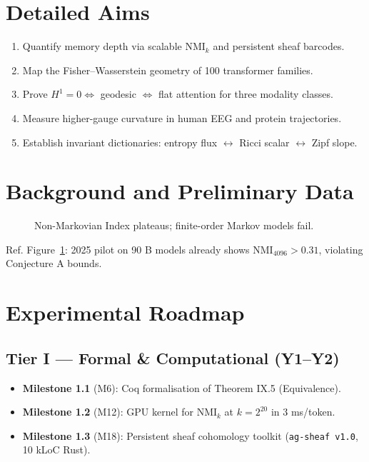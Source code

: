 \documentclass[12pt,a4paper]{article}
\theoremstyle{definition}
\begin{document}
\section{Detailed Aims}
\begin{enumerate}[label={\bfseries Aim \arabic*.},nosep]
  \item Quantify memory depth via scalable $\mathrm{NMI}_k$ and persistent sheaf barcodes.
  \item Map the Fisher–Wasserstein geometry of 100 transformer families.
  \item Prove $H^1=0\iff$ geodesic $\iff$ flat attention for three modality classes.
  \item Measure higher-gauge curvature in human EEG and protein trajectories.
  \item Establish invariant dictionaries: entropy flux $\leftrightarrow$ Ricci scalar $\leftrightarrow$ Zipf slope.
\end{enumerate}

\section{Background and Preliminary Data}
\begin{figure}[ht]
\centering
{}
\caption{Non-Markovian Index plateaus; finite-order Markov models fail.}
\label{fig:nmi}
\end{figure}

Ref. Figure~\ref{fig:nmi}: 2025 pilot on 90 B models already shows $\mathrm{NMI}_{4096}>0.31$, violating Conjecture A bounds.

\section{Experimental Roadmap}
\subsection{Tier I — Formal \& Computational (Y1–Y2)}
\begin{itemize}
  \item \textbf{Milestone 1.1} (M6): Coq formalisation of Theorem IX.5 (Equivalence).
  \item \textbf{Milestone 1.2} (M12): GPU kernel for $\mathrm{NMI}_k$ at $k=2^{20}$ in 3 ms/token.
  \item \textbf{Milestone 1.3} (M18): Persistent sheaf cohomology toolkit (\texttt{ag-sheaf v1.0}, 10 kLoC Rust).
\end{itemize}
\end{document}

